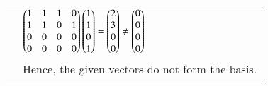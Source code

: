 \documentclass[journal,12pt,twocolumn]{IEEEtran}
\begin{document}
\begin{table}[h]
\begin{tabular}{|m{4.5cm}|l|}
		&$\begin{pmatrix}1 & 1 & 1 & 0 \\ 1 & 1 & 0 & 1\\ 0 & 0 & 0 & 0\\0 & 0 & 0 & 0\end{pmatrix}\begin{pmatrix}1\\1\\0\\1\end{pmatrix} = \begin{pmatrix}2\\3\\0\\0\end{pmatrix} \not = \begin{pmatrix}0\\0\\0\\0\end{pmatrix}$ \\
		&Hence, the given vectors do not form the basis.\\
		\hline
	\end{tabular}
\end{table}
\end{document}
